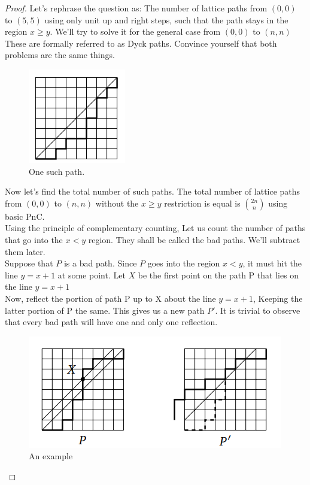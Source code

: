 \begin{proof}
    Let's rephrase the question as: The number of lattice paths from $(0, 0)$ to $(5, 5)$ using only unit up and right steps, such that the path stays in the region $x \geq y$. We'll try to solve it for the general case from $(0,0)$ to $(n,n)$  These are formally referred to as Dyck paths. Convince yourself that both problems are the same things.\\
    \begin{figure}
        \centering
        \includegraphics[width=0.5\linewidth]{Photos/Catlan on lattice.png}
        \caption{One such path.}
        
    \end{figure}
    Now let's find the total number of such paths. The total number of lattice paths from $(0, 0)$ to $(n, n)$ without the $x \geq y$ restriction is equal is $\binom{2n}{n}$ using basic PnC. \\
    Using the principle of complementary counting, Let us count the number of paths that go into the $x < y$ region.  They shall be called the bad paths. We'll subtract them later.\\
    Suppose that $P$ is a bad path. Since $P$ goes into the region $x < y$, it must hit the line $y = x + 1$ at some point. Let $X$ be the first point on the path P that lies on the line $y = x + 1$\\
    Now, reflect the portion of path P up to X about the line $y = x + 1$, Keeping the latter portion of P the same. This gives us a new path $P'$. It is trivial to observe that every bad path will have one and only one reflection.\\
    \begin{figure}
        \centering
        \includegraphics[width=0.5\linewidth]{Photos/Bad path reflection(catlan).png}
        \caption{An example}
        

\end{figure}
\end{proof}
